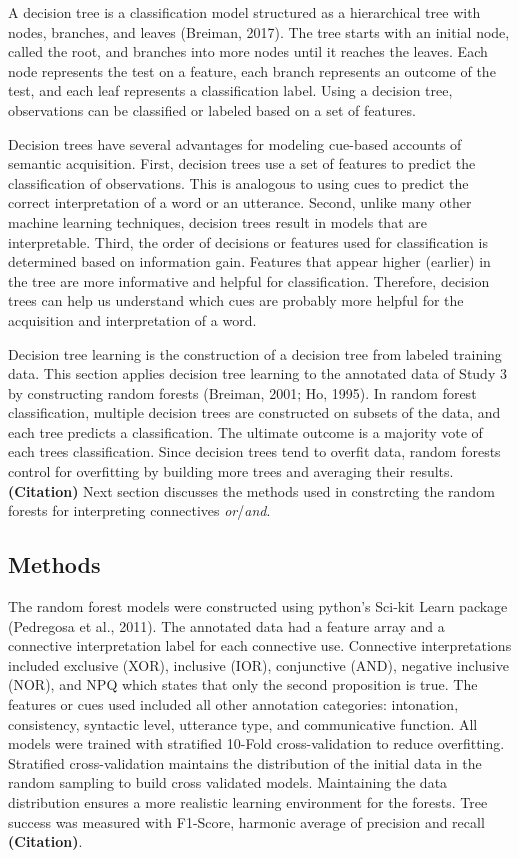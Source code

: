 \documentclass[,man,floatsintext]{apa6}
\begin{document}
A decision tree is a classification model structured as a hierarchical tree with nodes, branches, and leaves (Breiman, 2017). The tree starts with an initial node, called the root, and branches into more nodes until it reaches the leaves. Each node represents the test on a feature, each branch represents an outcome of the test, and each leaf represents a classification label. Using a decision tree, observations can be classified or labeled based on a set of features.

Decision trees have several advantages for modeling cue-based accounts of semantic acquisition. First, decision trees use a set of features to predict the classification of observations. This is analogous to using cues to predict the correct interpretation of a word or an utterance. Second, unlike many other machine learning techniques, decision trees result in models that are interpretable. Third, the order of decisions or features used for classification is determined based on information gain. Features that appear higher (earlier) in the tree are more informative and helpful for classification. Therefore, decision trees can help us understand which cues are probably more helpful for the acquisition and interpretation of a word.

Decision tree learning is the construction of a decision tree from labeled training data. This section applies decision tree learning to the annotated data of Study 3 by constructing random forests (Breiman, 2001; Ho, 1995). In random forest classification, multiple decision trees are constructed on subsets of the data, and each tree predicts a classification. The ultimate outcome is a majority vote of each trees classification. Since decision trees tend to overfit data, random forests control for overfitting by building more trees and averaging their results. \textbf{(Citation)} Next section discusses the methods used in constrcting the random forests for interpreting connectives \emph{or}/\emph{and}.

\hypertarget{methods-2}{%
\subsection{Methods}\label{methods-2}}

The random forest models were constructed using python's Sci-kit Learn package (Pedregosa et al., 2011). The annotated data had a feature array and a connective interpretation label for each connective use. Connective interpretations included exclusive (XOR), inclusive (IOR), conjunctive (AND), negative inclusive (NOR), and NPQ which states that only the second proposition is true. The features or cues used included all other annotation categories: intonation, consistency, syntactic level, utterance type, and communicative function. All models were trained with stratified 10-Fold cross-validation to reduce overfitting. Stratified cross-validation maintains the distribution of the initial data in the random sampling to build cross validated models. Maintaining the data distribution ensures a more realistic learning environment for the forests. Tree success was measured with F1-Score, harmonic average of precision and recall \textbf{(Citation)}.
\end{document}

